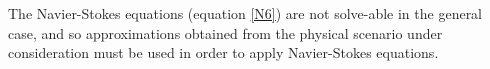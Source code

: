 \begin{frame}
	
	\begin{center}
	\end{center}
\end{frame}

The Navier-Stokes equations (equation \eqref{N6}) are not solve-able in the general case, and so approximations obtained from the physical scenario under consideration must be used in order to apply Navier-Stokes equations. 